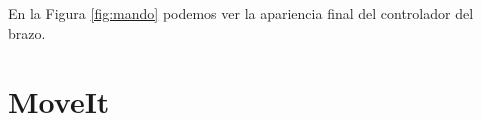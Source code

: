 En la Figura \ref{fig:mando} podemos ver la apariencia final del controlador del brazo.


\section{MoveIt}
\label{sec:br_moveit}









